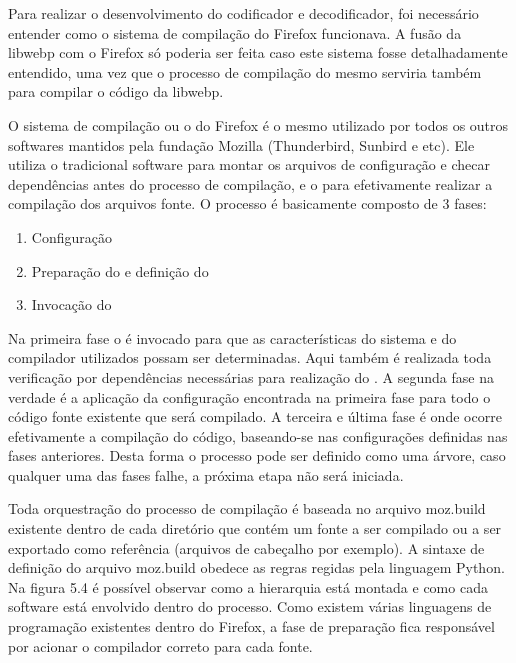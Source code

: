 \documentclass[espaco=simples,appendix=Name]{abnt}
\begin{document}
Para realizar o desenvolvimento do codificador e decodificador, foi necessário entender como o sistema de compilação do Firefox funcionava. A fusão da libwebp com o Firefox só poderia ser feita caso este sistema fosse detalhadamente entendido, uma vez que o processo de compilação do mesmo serviria também para compilar o código da libwebp.

O sistema de compilação ou o  do Firefox é o mesmo utilizado por todos os outros softwares mantidos pela fundação Mozilla (Thunderbird, Sunbird e etc). Ele utiliza o tradicional software  para montar os arquivos de configuração e checar dependências antes do processo de compilação, e o  para efetivamente realizar a compilação dos arquivos fonte. O processo é basicamente composto de 3 fases:
\begin{enumerate}
        \item Configuração 
        \item Preparação do  e definição do  
        \item Invocação do 
\end{enumerate}

Na primeira fase o  é invocado para que as características do sistema e do compilador utilizados possam ser determinadas. Aqui também é realizada toda verificação por dependências necessárias para realização do . A segunda fase na verdade é a aplicação da configuração encontrada na primeira fase para todo o código fonte existente que será compilado. A terceira e última fase é onde ocorre efetivamente a compilação do código, baseando-se nas configurações definidas nas fases anteriores. Desta forma o processo pode ser definido como uma árvore, caso qualquer uma das fases falhe, a próxima etapa não será iniciada.

Toda orquestração do processo de compilação é baseada no arquivo moz.build existente dentro de cada diretório que contém um fonte a ser compilado ou a ser exportado como referência (arquivos de cabeçalho por exemplo). A sintaxe de definição do arquivo moz.build obedece as regras regidas pela linguagem Python. Na figura 5.4 é possível observar como a hierarquia está montada e como cada software está envolvido dentro do processo. Como existem várias linguagens de programação existentes dentro do Firefox, a fase de preparação fica responsável por acionar o compilador correto para cada fonte.
\end{document}

